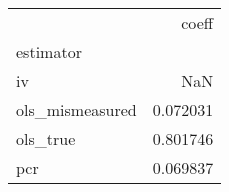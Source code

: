 \begin{tabular}{lr}
\toprule
{} &     coeff \\
estimator       &           \\
\midrule
iv              &       NaN \\
ols\_mismeasured &  0.072031 \\
ols\_true        &  0.801746 \\
pcr             &  0.069837 \\
\bottomrule
\end{tabular}
